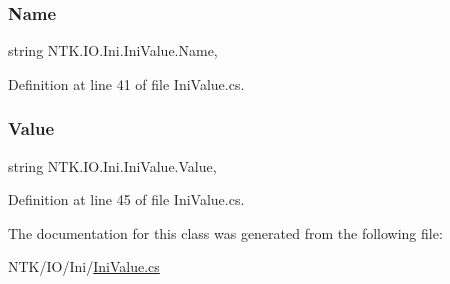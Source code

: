 \subsubsection{\texorpdfstring{Name}{Name}}
{\footnotesize\ttfamily string N\+T\+K.\+I\+O.\+Ini.\+Ini\+Value.\+Name\hspace{0.3cm}{\ttfamily [get]}, {\ttfamily [set]}}







Definition at line 41 of file Ini\+Value.\+cs.

\mbox{\label{class_n_t_k_1_1_i_o_1_1_ini_1_1_ini_value_a2b4e53d42dae3fbc493353fa2a4d75f4}} 
\subsubsection{\texorpdfstring{Value}{Value}}
{\footnotesize\ttfamily string N\+T\+K.\+I\+O.\+Ini.\+Ini\+Value.\+Value\hspace{0.3cm}{\ttfamily [get]}, {\ttfamily [set]}}







Definition at line 45 of file Ini\+Value.\+cs.



The documentation for this class was generated from the following file\+:\begin{DoxyCompactItemize}
\item 
N\+T\+K/\+I\+O/\+Ini/\mbox{\hyperlink{_ini_value_8cs}{Ini\+Value.\+cs}}\end{DoxyCompactItemize}
